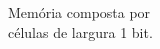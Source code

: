 \documentclass[preview]{standalone}
\begin{document}
Memória composta por\\células de largura 1 bit.\\
\end{document}
